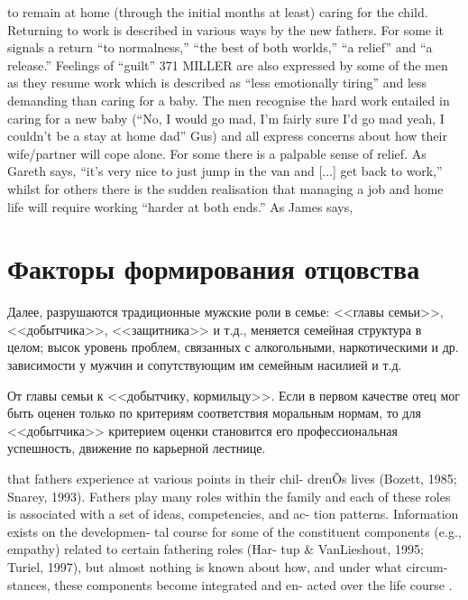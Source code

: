 \documentclass{../../common/thesisbyxetex}
\begin{document}
to remain at home (through the initial months at least) caring for the child. Returning
to work is described in various ways by the new fathers. For some it signals a return
“to normalness,” “the best of both worlds,” “a relief” and “a release.” Feelings of “guilt”
371
MILLER
are also expressed by some of the men as they resume work which is described as “less
emotionally tiring” and less demanding than caring for a baby. The men recognise the
hard work entailed in caring for a new baby (“No, I would go mad, I’m fairly sure I’d
go mad yeah, I couldn’t be a stay at home dad” Gus) and all express concerns about how
their wife/partner will cope alone. For some there is a palpable sense of relief. As
Gareth says, “it’s very nice to just jump in the van and [...] get back to work,” whilst
for others there is the sudden realisation that managing a job and home life will require
working “harder at both ends.”\cite[370-371]{tri} As James says,


\section{Факторы формирования отцовства}


Далее, разрушаются традиционные мужские роли в семье: <<главы семьи>>,
<<добытчика>>, <<защитника>> и т.д., меняется семейная структура в целом; высок уровень проблем,
связанных с алкогольными, наркотическими и др. зависимости у мужчин и сопутствующим им семейным
насилией и т.д.

От главы семьи к <<добытчику, кормильцу>>. Если в первом качестве отец мог быть оценен только по
критериям
соответствия моральным нормам, то для <<добытчика>> критерием оценки становится его 
профессиональная успешность, движение по карьерной лестнице. 

that fathers experience at various points in their chil-
drenÕs lives (Bozett, 1985; Snarey, 1993). Fathers play
many roles within the family and each of these roles is
associated with a set of ideas, competencies, and ac-
tion patterns. Information exists on the developmen-
tal course for some of the constituent components
(e.g., empathy) related to certain fathering roles (Har-
tup \& VanLieshout, 1995; Turiel, 1997), but almost
nothing is known about how, and under what circum-
stances, these components become integrated and en-
acted over the life course \cite[131]{f21}.
\end{document}
